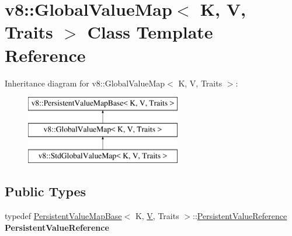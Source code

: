 \hypertarget{classv8_1_1GlobalValueMap}{}\section{v8\+:\+:Global\+Value\+Map$<$ K, V, Traits $>$ Class Template Reference}
\label{classv8_1_1GlobalValueMap}
Inheritance diagram for v8\+:\+:Global\+Value\+Map$<$ K, V, Traits $>$\+:\begin{figure}[H]
\begin{center}
\leavevmode
\includegraphics[height=3.000000cm]{classv8_1_1GlobalValueMap}
\end{center}
\end{figure}
\subsection*{Public Types}
\begin{DoxyCompactItemize}
\item 
\mbox{\label{classv8_1_1GlobalValueMap_ac01835ce1863e1c577882e31b60efc35}} 
typedef \mbox{\hyperlink{classv8_1_1PersistentValueMapBase}{Persistent\+Value\+Map\+Base}}$<$ K, \mbox{\hyperlink{classV}{V}}, Traits $>$\+::\mbox{\hyperlink{classv8_1_1PersistentValueMapBase_1_1PersistentValueReference}{Persistent\+Value\+Reference}} {\bfseries Persistent\+Value\+Reference}
\end{DoxyCompactItemize}

